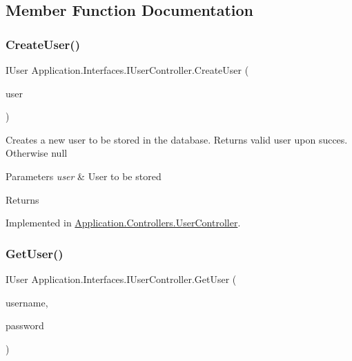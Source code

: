 \subsection{Member Function Documentation}
\mbox{\label{interface_application_1_1_interfaces_1_1_i_user_controller_aca064ba3a4c3c2d0dd1339b8a4995e86}} 
\subsubsection{\texorpdfstring{Create\+User()}{CreateUser()}}
{\footnotesize\ttfamily I\+User Application.\+Interfaces.\+I\+User\+Controller.\+Create\+User (\begin{DoxyParamCaption}\item[{I\+User}]{user }\end{DoxyParamCaption})}



Creates a new user to be stored in the database. Returns valid user upon succes. Otherwise null 


\begin{DoxyParams}{Parameters}
{\em user} & User to be stored\\
\hline
\end{DoxyParams}
\begin{DoxyReturn}{Returns}

\end{DoxyReturn}


Implemented in \mbox{\hyperlink{class_application_1_1_controllers_1_1_user_controller_abf08955a5adc363fa137399a961a14fc}{Application.\+Controllers.\+User\+Controller}}.

\mbox{\label{interface_application_1_1_interfaces_1_1_i_user_controller_afdea9f68822192392d4b973e300f56af}} 
\subsubsection{\texorpdfstring{Get\+User()}{GetUser()}}
{\footnotesize\ttfamily I\+User Application.\+Interfaces.\+I\+User\+Controller.\+Get\+User (\begin{DoxyParamCaption}\item[{string}]{username,  }\item[{string}]{password }\end{DoxyParamCaption})}



